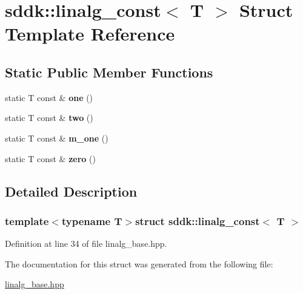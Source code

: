 \hypertarget{structsddk_1_1linalg__const}{}\section{sddk\+:\+:linalg\+\_\+const$<$ T $>$ Struct Template Reference}
\label{structsddk_1_1linalg__const}
\subsection*{Static Public Member Functions}
\begin{DoxyCompactItemize}
\item 
\hypertarget{structsddk_1_1linalg__const_aff717dd5e954615a3722ec82ea01bb3f}{}static T const \& {\bfseries one} ()\label{structsddk_1_1linalg__const_aff717dd5e954615a3722ec82ea01bb3f}

\item 
\hypertarget{structsddk_1_1linalg__const_af8fe3cb7a5f4a86bc89f2240f9b286eb}{}static T const \& {\bfseries two} ()\label{structsddk_1_1linalg__const_af8fe3cb7a5f4a86bc89f2240f9b286eb}

\item 
\hypertarget{structsddk_1_1linalg__const_a06f0966aeeb85de4beaade12270898b7}{}static T const \& {\bfseries m\+\_\+one} ()\label{structsddk_1_1linalg__const_a06f0966aeeb85de4beaade12270898b7}

\item 
\hypertarget{structsddk_1_1linalg__const_a991151bafbcb825380275b7b0e0d17df}{}static T const \& {\bfseries zero} ()\label{structsddk_1_1linalg__const_a991151bafbcb825380275b7b0e0d17df}

\end{DoxyCompactItemize}


\subsection{Detailed Description}
\subsubsection*{template$<$typename T$>$struct sddk\+::linalg\+\_\+const$<$ T $>$}



Definition at line 34 of file linalg\+\_\+base.\+hpp.



The documentation for this struct was generated from the following file\+:\begin{DoxyCompactItemize}
\item 
\hyperlink{linalg__base_8hpp}{linalg\+\_\+base.\+hpp}\end{DoxyCompactItemize}
